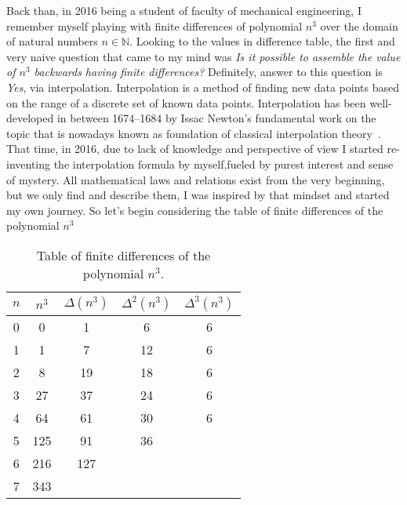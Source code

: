 Back than, in 2016 being a student of faculty of mechanical engineering,
I remember myself playing with finite differences of polynomial $n^3$ over the domain of natural numbers $n\in\mathbb{N}$.
Looking to the values in difference table,
the first and very naive question that came to my mind was \textit{Is it possible to assemble the value of
    $n^3$ backwards having finite differences?}
Definitely, answer to this question is \textit{Yes}, via interpolation.
Interpolation is a method of finding new data points based on the range of a discrete set of known data points.
Interpolation has been well-developed in between 1674--1684
by Issac Newton's fundamental work on the topic that is nowadays known as foundation of classical interpolation
theory~\cite{meijering2002chronology}.
That time, in 2016, due to lack of knowledge and perspective of view I started re-inventing the interpolation
formula by myself,fueled by purest interest and sense of mystery.
All mathematical laws and relations exist from the very beginning, but we only find and describe them,
I was inspired by that mindset and started my own journey.
So let's begin considering the table of finite differences of the polynomial $n^3$
\begin{table}[H]
    \begin{center}
        \setlength\extrarowheight{-6pt}
        \begin{tabular}{c|cccc}
            $n$ & $n^3$ & $\Delta(n^3)$ & $\Delta^2(n^3)$ & $\Delta^3(n^3)$ \\
            \hline
            0   & 0     & 1             & 6               & 6               \\
            1   & 1     & 7             & 12              & 6               \\
            2   & 8     & 19            & 18              & 6               \\
            3   & 27    & 37            & 24              & 6               \\
            4   & 64    & 61            & 30              & 6               \\
            5   & 125   & 91            & 36              &                 \\
            6   & 216   & 127           &                 &                 \\
            7   & 343   &               &                 &
        \end{tabular}
    \end{center}
    \caption{Table of finite differences of the polynomial $n^3$.} \label{tab:table}
\end{table}
